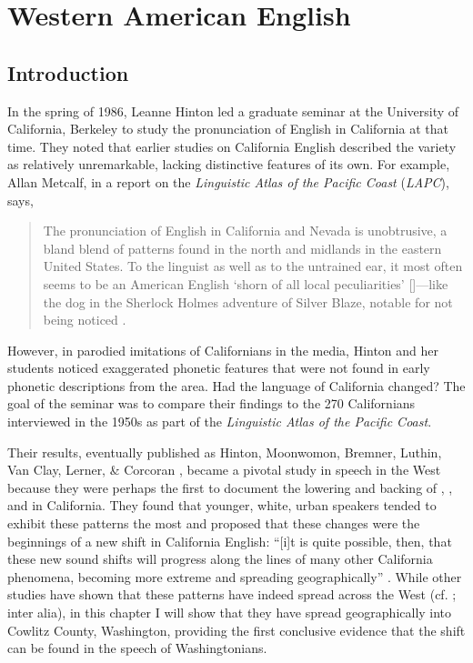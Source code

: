 \chapter{Western American English}
\label{ch:lit_review}




\section{Introduction}
\label{sec:lit_review_intro}

In the spring of 1986, Leanne Hinton led a graduate seminar at the University of California, Berkeley to study the pronunciation of English in California at that time. They noted that earlier studies on California English described the variety as relatively unremarkable, lacking distinctive features of its own. For example, Allan Metcalf, in a report on the \textit{Linguistic Atlas of the Pacific Coast} (\textit{LAPC}), says,
\begin{quote}
    The pronunciation of English in California and Nevada is unobtrusive, a bland blend of patterns found in the north and midlands in the eastern United States. To the linguist as well as to the untrained ear, it most often seems to be an American English `shorn of all local peculiarities' [\citep[192]{pei_1967}]---like the dog in the Sherlock Holmes adventure of Silver Blaze, notable for not being noticed \citep[8]{metcalf_nd}.
\end{quote}
However, in parodied imitations of Californians in the media, Hinton and her students noticed exaggerated phonetic features that were not found in early phonetic descriptions from the area. Had the language of California changed? The goal of the seminar was to compare their findings to the 270 Californians interviewed in the 1950s as part of the \textit{Linguistic Atlas of the Pacific Coast}.

Their results, eventually published as Hinton, Moonwomon, Bremner, Luthin, Van Clay, Lerner, \& Corcoran \citeyearpar{hinton_etal_1987}, became a pivotal study in speech in the West because they were perhaps the first to document the lowering and backing of \kit, \dress, and \trap in California. They found that younger, white, urban speakers tended to exhibit these patterns the most and proposed that these changes were the beginnings of a new shift in California English: ``[i]t is quite possible, then, that these new sound shifts will progress along the lines of many other California phenomena, becoming more extreme and spreading geographically'' \citep[126]{hinton_etal_1987}. While other studies have shown that these patterns have indeed spread across the West (cf. \citealt{fridland_etal_2016_pads}; \citealt{fridland_etal_2017_pads} inter alia), in this chapter I will show that they have spread geographically into Cowlitz County, Washington, providing the first conclusive evidence that the shift can be found in the speech of Washingtonians.

